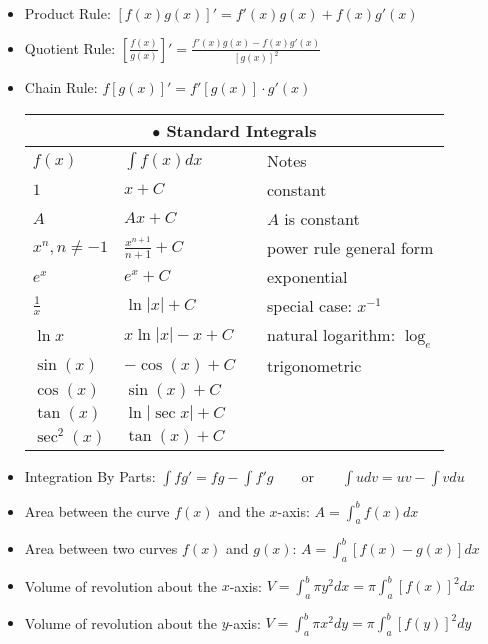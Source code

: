 \begin{itemize}
	\item Product Rule: $[f(x)g(x)]' = f'(x)g(x) + f(x)g'(x)$
	\item Quotient Rule: $\displaystyle \left[\frac{f(x)}{g(x)}\right]' = \frac{f'(x)g(x) - f(x)g'(x)}{[g(x)]^2}$
	\item Chain Rule: $f[g(x)]' = f'[g(x)] \cdot g'(x)$
\clearpage
\thispagestyle{empty}
		\renewcommand{\arraystretch}{1.2}
		\begin{tabular}{llcl}
			\multicolumn{4}{c}{$\bullet$ Standard Integrals}\\\midrule
			$f(x)$  &  $\int f(x)dx$&&Notes \\ \midrule
			$1$&$x+C$&&constant\\
			$A$&$Ax+C$&&$A$ is constant\\\midrule
			$x^n, n \neq -1$ & $\displaystyle\frac{x^{n+1}}{n+1}+C$&&power rule general form\\ 
			$e^x$ & $e^x+C$&&exponential\\ 
			$\frac{1}{x}$ & $\ln|x|+C$&&special case: $x^{-1}$\\
			$\ln x$&$x\ln |x|-x+C$&&natural logarithm: $\log_e$\\\midrule
			$\sin(x)$ & $-\cos(x)+C$&& trigonometric \\ 
			$\cos(x)$ & $\sin(x)+C$\\ 
			$\tan (x)$&$\ln |\sec x|+C$\\
			$\sec^2(x)$ & $\tan(x)+C$ \\ \bottomrule
		\end{tabular}
	\item Integration By Parts: $\displaystyle \int fg' = fg-\int f'g \qquad \text{or} \qquad \int udv = uv - \int vdu$
	\item Area between the curve $f(x)$ and the $x$-axis: $\displaystyle A=\int_{a}^{b} f(x)dx$\\
	\item Area between two curves $f(x)$ and $g(x)$: $\displaystyle A=\int_{a}^{b} \left[f(x)-g(x)\right]dx$\\
	\item Volume of revolution about the $x$-axis:
	$\displaystyle V= \int_{a}^{b} \pi y^2 dx = \pi\int_{a}^{b}  [f(x)]^2 dx$
	\item Volume of revolution about the $y$-axis:
	$\displaystyle V= \int_{a}^{b} \pi x^2 dy = \pi\int_{a}^{b}  [f(y)]^2 dy$
\end{itemize}

